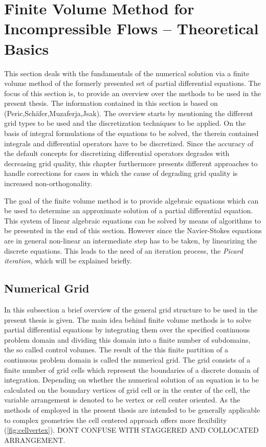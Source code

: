   \section{Finite Volume Method for Incompressible Flows -- Theoretical Basics}

  This section deals with the fundamentals of the numerical solution via a finite volume method of the formerly presented set of partial differential equations. The focus of this section is, to provide an overview over the methods to be used in the present thesis. The information contained in this section is based on (Peric,Schäfer,Muzaferja,Jsak). The overview starts by mentioning the different grid types to be used and the discretization techniques to be applied. On the basis of integral formulations of the equations to be solved, the therein contained integrals and differential operators have to be discretized. Since the accuracy of the default concepts for discretizing differential operators degrades with decreasing grid quality, this chapter furthermore presents different approaches to handle corrections for cases in which the cause of degrading grid quality is increased non-orthogonality. 
  
 The goal of the finite volume method is to provide algebraic equations which can be used to determine an approximate solution of a partial differential equation. This system of linear algebraic equations can be solved by means of algorithms to be presented in the end of this section. However since the Navier-Stokes equations are in general non-linear an intermediate step has to be taken, by linearizing the discrete equations. This leads to the need of an iteration process, the \textit{Picard iteration}, which will be explained briefly.
      
  \subsection{Numerical Grid}

  In this subsection a brief overview of the general grid structure to be used in the present thesis is given. The main idea behind finite volume methods is to solve partial differential equations by integrating them over the specified continuous problem domain and dividing this domain into a finite number of subdomains, the so called control volumes. The result of the this finite partition of a continuous problem domain is called the numerical grid. The grid consists of a finite number of grid cells which represent the boundaries of a discrete domain of integration. Depending on whether the numerical solution of an equation is to be calculated on the boundary vertices of grid cell or in the center of the cell, the variable arrangement is denoted to be vertex or cell center oriented. As the methods of employed in the present thesis are intended to be generally applicable to complex geometries the cell centered approach offers more flexibility (\ref{fig:cellvertex}). DONT CONFUSE WITH STAGGERED AND COLLOCATED ARRANGEMENT.

